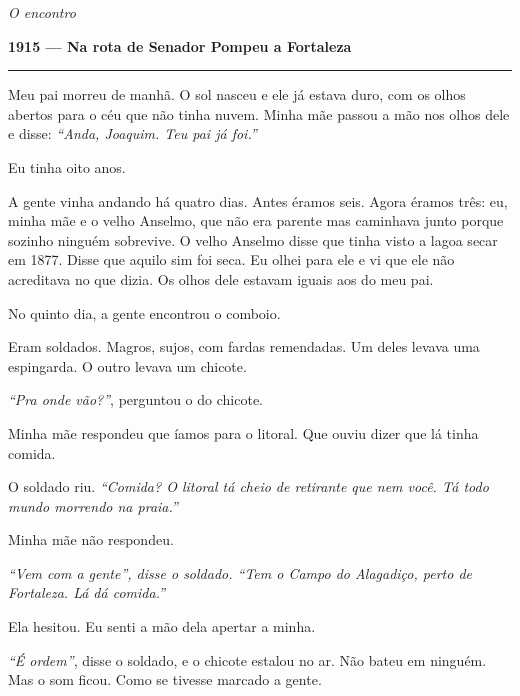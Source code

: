
\noindent \textit{O encontro}

\noindent \textbf{1915 --- Na rota de Senador Pompeu a Fortaleza}

\vspace{0.5em}\noindent\rule{\textwidth}{0.5pt}\vspace{0.5em}

\noindent Meu pai morreu de manhã. O sol nasceu e ele já estava duro, com os olhos abertos para o céu que não tinha nuvem. Minha mãe passou a mão nos olhos dele e disse: \textit{\textquotedblleft{}Anda, Joaquim. Teu pai já foi.\textquotedblright{}}

\noindent Eu tinha oito anos.

\noindent A gente vinha andando há quatro dias. Antes éramos seis. Agora éramos três: eu, minha mãe e o velho Anselmo, que não era parente mas caminhava junto porque sozinho ninguém sobrevive. O velho Anselmo disse que tinha visto a lagoa secar em 1877. Disse que aquilo sim foi seca. Eu olhei para ele e vi que ele não acreditava no que dizia. Os olhos dele estavam iguais aos do meu pai.

\noindent No quinto dia, a gente encontrou o comboio.

\noindent Eram soldados. Magros, sujos, com fardas remendadas. Um deles levava uma espingarda. O outro levava um chicote.

\noindent \textit{\textquotedblleft{}Pra onde vão?\textquotedblright{}}, perguntou o do chicote.

\noindent Minha mãe respondeu que íamos para o litoral. Que ouviu dizer que lá tinha comida.

\noindent O soldado riu. \textit{\textquotedblleft{}Comida? O litoral tá cheio de retirante que nem você. Tá todo mundo morrendo na praia.\textquotedblright{}}

\noindent Minha mãe não respondeu.

\noindent \textit{\textquotedblleft{}Vem com a gente\textquotedblright{}\textit{, disse o soldado. }\textquotedblleft{}Tem o Campo do Alagadiço, perto de Fortaleza. Lá dá comida.\textquotedblright{}}

\noindent Ela hesitou. Eu senti a mão dela apertar a minha.

\noindent \textit{\textquotedblleft{}É ordem\textquotedblright{}}, disse o soldado, e o chicote estalou no ar. Não bateu em ninguém. Mas o som ficou. Como se tivesse marcado a gente.

